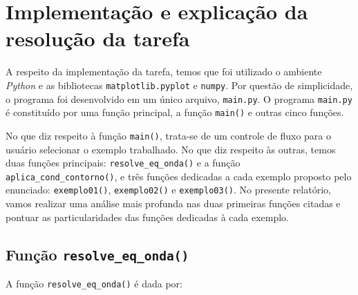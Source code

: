 \documentclass[column,amsmath,amssymb,floatfix]{revtex4}
\begin{document}
\section{Implementação e explicação da resolução da tarefa}

A respeito da implementação da tarefa, temos que foi utilizado o ambiente \textit{Python} e as bibliotecas \texttt{matplotlib.pyplot} e \texttt{numpy}. Por questão de simplicidade, o programa foi desenvolvido em um único arquivo, \texttt{main.py}. O programa \texttt{main.py} é constituído por uma função principal, a função \texttt{main()} e outras cinco funções.

No que diz respeito à função \texttt{main()}, trata-se de um controle de fluxo para o usuário selecionar o exemplo trabalhado. No que diz respeito às outras, temos duas funções principais: \texttt{resolve\_eq\_onda()} e a função \texttt{aplica\_cond\_contorno()}, e três funções dedicadas a cada exemplo proposto pelo enunciado: \texttt{exemplo01()}, \texttt{exemplo02()} e \texttt{exemplo03()}. No presente relatório, vamos realizar uma análise mais profunda nas duas primeiras funções citadas e pontuar as particularidades das funções dedicadas à cada exemplo.



\subsection{Função \texttt{resolve\_eq\_onda()}}

A função \texttt{resolve\_eq\_onda()} é dada por:
\end{document}
